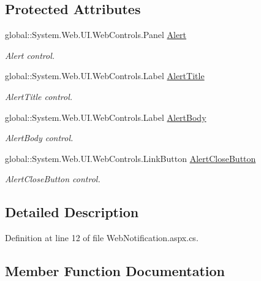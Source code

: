 \subsection*{Protected Attributes}
\begin{DoxyCompactItemize}
\item 
global\+::\+System.\+Web.\+U\+I.\+Web\+Controls.\+Panel \mbox{\hyperlink{classWebApplication_1_1WebNotification_aad27a714fac49b6503c5e3f5184cc0ea}{Alert}}
\begin{DoxyCompactList}\small\item\em Alert control. \end{DoxyCompactList}\item 
global\+::\+System.\+Web.\+U\+I.\+Web\+Controls.\+Label \mbox{\hyperlink{classWebApplication_1_1WebNotification_ae5e61b002ffea74359abf68c0ec09d7e}{Alert\+Title}}
\begin{DoxyCompactList}\small\item\em Alert\+Title control. \end{DoxyCompactList}\item 
global\+::\+System.\+Web.\+U\+I.\+Web\+Controls.\+Label \mbox{\hyperlink{classWebApplication_1_1WebNotification_a10b7a855fc86a7997656b31a043493ef}{Alert\+Body}}
\begin{DoxyCompactList}\small\item\em Alert\+Body control. \end{DoxyCompactList}\item 
global\+::\+System.\+Web.\+U\+I.\+Web\+Controls.\+Link\+Button \mbox{\hyperlink{classWebApplication_1_1WebNotification_a6d7bed1a8177347a50418856a6e39a66}{Alert\+Close\+Button}}
\begin{DoxyCompactList}\small\item\em Alert\+Close\+Button control. \end{DoxyCompactList}\end{DoxyCompactItemize}


\subsection{Detailed Description}


Definition at line 12 of file Web\+Notification.\+aspx.\+cs.



\subsection{Member Function Documentation}
\mbox{\label{classWebApplication_1_1WebNotification_aa48b42fe1fb4e4e1909063081de270f9}} 
